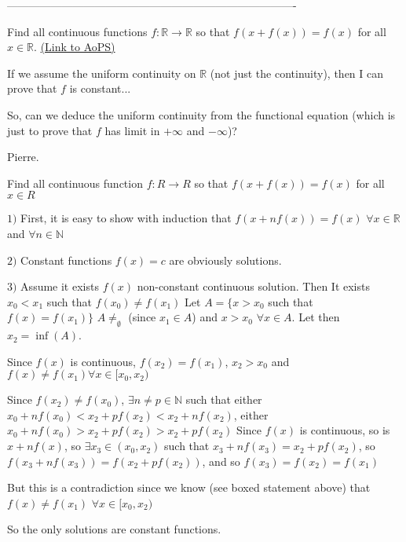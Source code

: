 -------------------------------------------------------------------------------

\begin{problem}
	Find all continuous functions $f: \mathbb R \to \mathbb R$ so that $ f(x+f(x))=f(x)$ for all $ x \in \mathbb R$.
	\flushright \href{https://artofproblemsolving.com/community/c6h181337}{(Link to AoPS)}
\end{problem}



\begin{solution}
	If we assume the uniform continuity on $ \mathbb{R}$ (not just the continuity), then I can prove that $ f$ is constant...  

So, can we deduce the uniform continuity from the functional equation (which is just to prove that $ f$ has limit in $ +\infty$ and $ -\infty$)?

Pierre.
\end{solution}



\begin{solution}
	\begin{tcolorbox}Find all continuous function $ f: R \to R$ so that $ f(x + f(x)) = f(x)$ for all $ x \in R$\end{tcolorbox}

$ 1)$ First, it is easy to show with induction that $ f(x+nf(x))=f(x)$ $ \forall x\in \mathbb{R}$ and $ \forall n\in\mathbb{N}$

$ 2)$ Constant functions $ f(x)=c$ are obviously solutions.

$ 3)$ Assume it exists $ f(x)$ non-constant continuous solution. Then 
It exists $ x_0<x_1$ such that $ f(x_0)\neq f(x_1)$
Let $ A=\{x>x_0$ such that $ f(x)=f(x_1)\}$
$ A\neq_\emptyset$ (since $ x_1\in A$) and $ x>x_0$ $ \forall x\in A$. Let then $ x_2=\inf(A)$.

Since $ f(x)$ is continuous, $ f(x_2)=f(x_1)$, $ x_2>x_0$ and $ \boxed{f(x)\neq f(x_1)\forall x\in[x_0,x_2)}$

Since $ f(x_2)\neq f(x_0)$, $ \exists n\neq p\in\mathbb{N}$ such that either $ x_0+nf(x_0)<x_2+pf(x_2)<x_2+nf(x_2)$, either $ x_0+nf(x_0)>x_2+pf(x_2)>x_2+pf(x_2)$
Since $ f(x)$ is continuous, so is $ x+nf(x)$, so $ \exists x_3\in(x_0,x_2)$ such that $ x_3+nf(x_3)=x_2+pf(x_2)$, so $ f(x_3+nf(x_3))=f(x_2+pf(x_2))$, and so $ f(x_3)=f(x_2)=f(x_1)$

But this is a contradiction since we know (see boxed statement above)  that $ f(x)\neq f(x_1)$ $ \forall x\in[x_0,x_2)$

So the only solutions are constant functions.
\end{solution}



